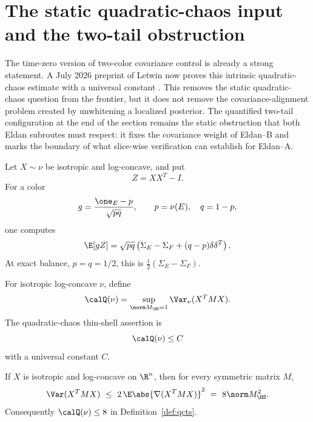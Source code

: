 \documentclass[../../main.tex]{subfiles}
\begin{document}
\section{The static quadratic-chaos input and the two-tail obstruction}
\label{sec:qcts}

The time-zero version of two-color covariance control is already a strong statement. A July 2026
preprint of Letwin now proves this intrinsic quadratic-chaos estimate with a universal constant
\cite{Letwin2026QuadraticKLS}. This removes the static quadratic-chaos question from the frontier,
but it does not remove the covariance-alignment problem created by unwhitening a localized
posterior. The quantified two-tail configuration at the end of the section remains the static
obstruction that both Eldan subroutes must respect: it fixes the covariance weight of Eldan--B and
marks the boundary of what slice-wise verification can establish for Eldan--A.

Let $X\sim\nu$ be isotropic and log-concave, and put
\[
  Z=XX^T-I.
\]
For a color
\[
  g=\frac{\one_E-p}{\sqrt{pq}},
  \qquad p=\nu(E),\quad q=1-p,
\]
one computes
\begin{equation}\label{eq:color-tensor}
  \E[gZ]=\sqrt{pq}\left(\Sigma_E-\Sigma_F+(q-p)\delta\delta^T\right).
\end{equation}
At exact balance, $p=q=1/2$, this is $\frac12(\Sigma_E-\Sigma_F)$.

\begin{definition}
\label{def:qcts}
For isotropic log-concave $\nu$, define
\[
  \calQ(\nu)=\sup_{\norm M_{\HS}=1}\Var_\nu(X^TMX).
\]
The quadratic-chaos thin-shell assertion is
\begin{equation}\label{eq:QCTS}
  \calQ(\nu)\le C
\end{equation}
with a universal constant $C$.
\end{definition}

\begin{theorem}
\label{thm:letwin-qcts}
If $X$ is isotropic and log-concave on $\R^n$, then for every symmetric matrix $M$,
\begin{equation}\label{eq:letwin-qcts}
  \Var(X^TMX)
  \ \le\ 2\,\E\abs{\nabla(X^TMX)}^2
  \ =\ 8\norm M_{\HS}^2.
\end{equation}
Consequently $\calQ(\nu)\le8$ in Definition~\ref{def:qcts}.
\end{theorem}
\end{document}
